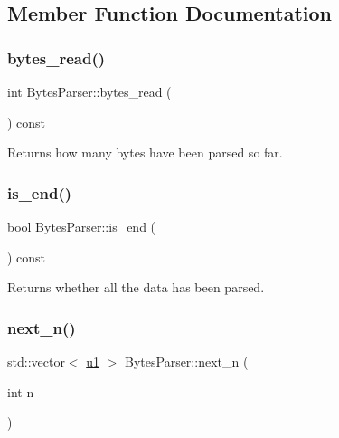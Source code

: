 \subsection{Member Function Documentation}
\mbox{\label{classBytesParser_a37f2e2e19b23ba08982241c7ed53b43a}} 
\subsubsection{\texorpdfstring{bytes\+\_\+read()}{bytes\_read()}}
{\footnotesize\ttfamily int Bytes\+Parser\+::bytes\+\_\+read (\begin{DoxyParamCaption}{ }\end{DoxyParamCaption}) const}



Returns how many bytes have been parsed so far. 

\mbox{\label{classBytesParser_a0cef47c62af80c1a50fc507c5a869757}} 
\subsubsection{\texorpdfstring{is\+\_\+end()}{is\_end()}}
{\footnotesize\ttfamily bool Bytes\+Parser\+::is\+\_\+end (\begin{DoxyParamCaption}{ }\end{DoxyParamCaption}) const}



Returns whether all the data has been parsed. 

\mbox{\label{classBytesParser_acb95ccefd93aa90ae9c74aaec13b497e}} 
\subsubsection{\texorpdfstring{next\+\_\+n()}{next\_n()}}
{\footnotesize\ttfamily std\+::vector$<$ \hyperlink{types_8h_a162f47a77ee24f6f77cd8c82ccd40ab7}{u1} $>$ Bytes\+Parser\+::next\+\_\+n (\begin{DoxyParamCaption}\item[{int}]{n }\end{DoxyParamCaption})}



